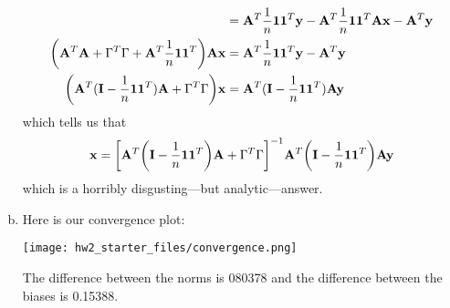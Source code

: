 \documentclass[12pt,letterpaper]{hmcpset}
\begin{document}
\begin{solution}
\begin{enumerate}[(a)]
\begin{align*}
		&= \vb A^T  \frac1n \vb 1 \vb 1^T \vb y - \vb A^T \frac1n \vb 1 \vb 1^T \vb A \vb x - \vb A^T \vb y \\
		 \qty(\vb A^T \vb A + \Gamma^T \Gamma + \vb A^T \frac1n \vb 1 \vb 1^T) \vb A  \vb x &= \vb A^T  \frac1n \vb 1 \vb 1^T \vb y - \vb A^T \vb y \\
		\qty(\vb A^T ( \vb I - \frac1n \vb 1 \vb 1^T) \vb A + \Gamma^T \Gamma) \vb x &= \vb A^T (\vb I - \frac1n \vb 1 \vb 1^T) \vb A \vb y  
		 \end{align*}
		 which tells us that
		 \begin{align*}
		 	\vb x = \qty[\vb A^T \qty( \vb I - \frac1n \vb 1 \vb 1^T) \vb A + \Gamma^T \Gamma]^{-1} \vb A^T \qty(\vb I - \frac1n \vb 1 \vb 1^T) \vb A \vb y  
		 \end{align*}
		 which is a horribly disgusting---but analytic---answer.


		\item Here is our convergence plot:
		\begin{center}
			\texttt{[image: hw2\_starter\_files/convergence.png]}
		\end{center}
		The difference between the norms is 080378 and the difference between the biases is 0.15388.
	\end{enumerate}
	\vfill
\end{solution}
\newpage
\end{document}
